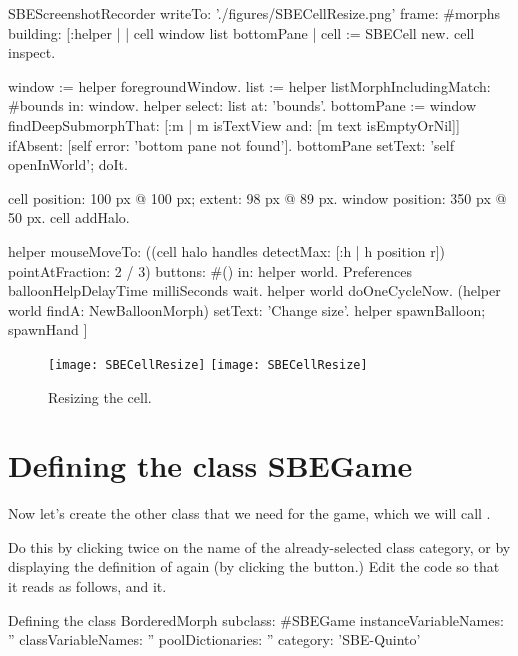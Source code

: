 \documentclass[a4paper,10pt,twoside]{book}
\begin{document}
\begin{ExecuteSmalltalkScript}
SBEScreenshotRecorder writeTo: './figures/SBECellResize.png' frame: #morphs building: [:helper |
	| cell window list bottomPane |
	cell := SBECell new.
	cell inspect.

	window := helper foregroundWindow.
	list := helper listMorphIncludingMatch: #bounds in: window.
	helper select: list at: 'bounds'.
	bottomPane := window findDeepSubmorphThat: [:m | m isTextView and: [m text isEmptyOrNil]] ifAbsent: [self error: 'bottom pane not found'].
	bottomPane setText: 'self openInWorld'; doIt.

	cell position: 100 px @ 100 px; extent: 98 px @ 89 px.
	window position: 350 px @ 50 px.
	cell addHalo.

	helper mouseMoveTo: ((cell halo handles detectMax: [:h | h position r]) pointAtFraction: 2 / 3) buttons: #() in: helper world.
	Preferences balloonHelpDelayTime milliSeconds wait.
	helper world doOneCycleNow.
	(helper world findA: NewBalloonMorph) setText: 'Change size'.
	helper spawnBalloon; spawnHand
]
\end{ExecuteSmalltalkScript}
\begin{figure}[htbp]
\centering
\ifluluelse
	{\texttt{[image: SBECellResize]} }
	{\texttt{[image: SBECellResize]} }
\caption{Resizing the cell.\label{fig:cellresize}}
\end{figure}



\section{Defining the class SBEGame}

Now let's create the other class that we need for the game, which we will call .

Do this by clicking twice on the name of the already-selected class category, or by displaying the definition of  again (by clicking the  button.)
Edit the code so that it reads as follows, and  it.

\begin{classdef}[sbegame]{Defining the  class}
BorderedMorph subclass: #SBEGame
   instanceVariableNames: ''
   classVariableNames: ''
   poolDictionaries: ''
   category: 'SBE-Quinto'
\end{classdef}
\end{document}
